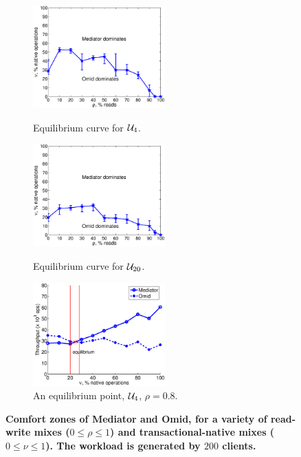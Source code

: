 \begin{figure}
  \centering
  \begin{subfigure}[t]{0.3\textwidth}
   \center
		{\includegraphics[width=2in]{Figs/matlab/equilibrium_curve_u4.eps}}
		\caption{Equilibrium curve for $\mathcal{U}_{4}$.}
               \label{fig:heatmap}
  \end{subfigure}%
\quad
	\begin{subfigure}[t]{0.3\textwidth}
		{\includegraphics[width=2in]{Figs/matlab/equilibrium_curve_u19.eps}}
		\caption{Equilibrium curve for  $\mathcal{U}_{20}$.}
       \label{fig:curves}
       \end{subfigure}
\quad
       \begin{subfigure}[t]{0.3\textwidth}
	\includegraphics[width=2in]{Figs/matlab/equilibrium_90r_u4.eps}
	\caption{An equilibrium point, $\mathcal{U}_{4}$, $\rho=0.8$.}
	\end{subfigure}

\caption{\bf{\small{Comfort zones of Mediator and Omid, for a variety of read-write mixes ($0 \leq \rho \leq 1$) 
and transactional-native mixes ($0 \leq \nu \leq 1$). The workload is generated by $200$ clients.
}}}
\label{fig:equilibrium}
\end{figure}

